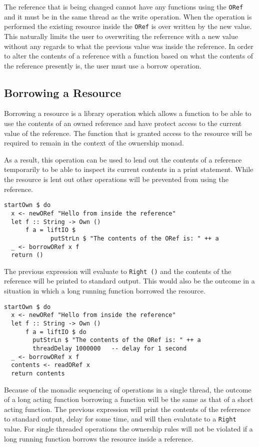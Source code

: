 \documentclass[onehalf,11pt]{beavtex}
\begin{document}
The reference that is being changed cannot have any functions using the
\texttt{ORef} and it must be in the same thread as the write operation.
When the operation is performed the existing resource inside the \texttt{ORef}
is over written by the new value.
This naturally limits the user to overwriting the referrence with a new value
without any regards to what the previous value was inside the reference.
In order to alter the contents of a reference with a function based on what
the contents of the reference presently is, the user must use a
borrow operation.

\subsection{Borrowing a Resource}

Borrowing a resource is a library operation which allows a function to be able
to use the contents of an owned reference and have protect access to
the current value of the reference.
The function that is granted access to the resource will be required to remain
in the context of the ownership monad.

As a result, this operation can be used to lend out the contents of a reference
temporarily to be able to inspect its current contents in a print statement.
While the resource is lent out other operations will be prevented from using the
reference.

\begin{lstlisting}
startOwn $ do
  x <- newORef "Hello from inside the reference"
  let f :: String -> Own ()
      f a = liftIO $ 
             putStrLn $ "The contents of the ORef is: " ++ a
  _ <- borrowORef x f
  return ()
\end{lstlisting}

The previous expression will evaluate to \texttt{Right ()} and the contents
of the reference will be printed to standard output.
This would also be the outcome in a situation in which a long running function
borrowed the resource.

\begin{lstlisting}
startOwn $ do
  x <- newORef "Hello from inside the reference"
  let f :: String -> Own ()
      f a = liftIO $ do
        putStrLn $ "The contents of the ORef is: " ++ a
        threadDelay 1000000   -- delay for 1 second
  _ <- borrowORef x f
  contents <- readORef x
  return contents
\end{lstlisting}

Because of the monadic sequencing of operations in a single thread,
the outcome of a long acting function borrowing a function will be the same
as that of a short acting function.
The previous expression will print the contents of the referrence to
standard output, delay for some time, and will then evalutate to
a \texttt{Right} value.
For single threaded operations the ownership rules will not be violated if
a long running function borrows the resource inside a reference.
\end{document}
